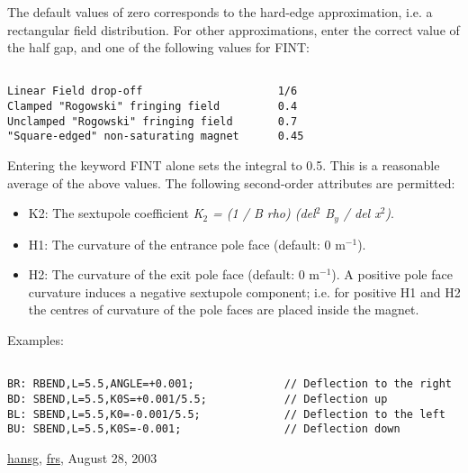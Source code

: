  The default values of zero corresponds to the hard-edge approximation, i.e. a rectangular field distribution. For other approximations, enter the correct value of the half gap, and one of the following values for FINT: 
\begin{verbatim}

Linear Field drop-off                     1/6
Clamped "Rogowski" fringing field         0.4
Unclamped "Rogowski" fringing field       0.7
"Square-edged" non-saturating magnet      0.45
\end{verbatim} Entering the keyword FINT alone sets the integral to 0.5. This is a reasonable average of the above values.  The following second-order attributes are permitted: 
\begin{itemize}
	\item K2: The sextupole coefficient \textit{K$_2$ = (1 / B rho) (del$^2$ B$_y$ / del x$^2$)}. 
	\item H1: The curvature of the entrance pole face (default: 0 m$^{-1}$). 
	\item H2: The curvature of the exit pole face (default: 0 m$^{-1}$). A positive pole face curvature induces a negative sextupole component; i.e. for positive H1 and H2 the centres of curvature of the pole faces are placed inside the magnet. 
\end{itemize} Examples: 
\begin{verbatim}

BR: RBEND,L=5.5,ANGLE=+0.001;              // Deflection to the right
BD: SBEND,L=5.5,K0S=+0.001/5.5;            // Deflection up
BL: SBEND,L=5.5,K0=-0.001/5.5;             // Deflection to the left
BU: SBEND,L=5.5,K0S=-0.001;                // Deflection down
\end{verbatim}

\href{http://www.cern.ch/Hans.Grote/hansg_sign.html}{hansg}, \href{http://www.cern.ch/Frank.Schmidt/frs_sign.html}{frs}, August 28, 2003  

